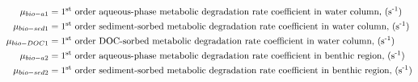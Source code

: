 \documentclass[fleqn, oneside, 11pt]{article}%
\begin{document}
\begin{preview}
\begin{align*}
\mu_{bio-a1} & = \text{1\textsuperscript{st} order aqueous-phase metabolic degradation rate coefficient in water column, (s\textsuperscript{-1})} \nonumber \\
\mu_{bio-sed1} & = \text{1\textsuperscript{st} order sediment-sorbed metabolic degradation rate coefficient in water column, (s\textsuperscript{-1})} \nonumber \\
\mu_{bio-DOC1} & = \text{1\textsuperscript{st} order DOC-sorbed metabolic degradation rate coefficient in water column, (s\textsuperscript{-1})} \nonumber \\
\mu_{bio-a2} & = \text{1\textsuperscript{st} order aqueous-phase metabolic degradation rate coefficient in benthic region, (s\textsuperscript{-1})} \nonumber \\
\mu_{bio-sed2} & = \text{1\textsuperscript{st} order sediment-sorbed metabolic degradation rate coefficient in benthic region, (s\textsuperscript{-1})} \nonumber \\
\end{align*} 
\end{preview}
\end{document}
